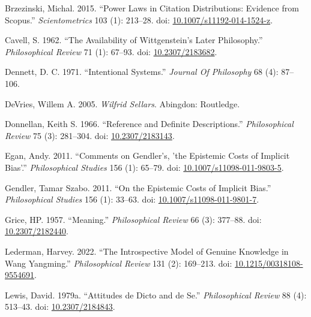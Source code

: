 \documentclass[
  10pt,
  letterpaper,
  DIV=11,
  numbers=noendperiod,
  twoside]{scrartcl}
\newlength{\cslhangindent}
\newenvironment{CSLReferences}[2] %
 {\begin{list}{}{%
  \setlength{\itemindent}{0pt}
  \setlength{\leftmargin}{0pt}
  \setlength{\parsep}{0pt}
  \ifodd #1
   \setlength{\leftmargin}{\cslhangindent}
   \setlength{\itemindent}{-1\cslhangindent}
  \fi
  \setlength{\itemsep}{#2\baselineskip}}}
 {\end{list}}
\begin{document}
\label{refs}
\begin{CSLReferences}{1}{0}
Brzezinski, Michal. 2015. {``Power Laws in Citation Distributions:
Evidence from Scopus.''} \emph{Scientometrics} 103 (1): 213--28. doi:
\href{https://doi.org/10.1007/s11192-014-1524-z}{10.1007/s11192-014-1524-z}.

Cavell, S. 1962. {``The Availability of Wittgenstein's Later
Philosophy.''} \emph{Philosophical Review} 71 (1): 67--93. doi:
\href{https://doi.org/10.2307/2183682}{10.2307/2183682}.

Dennett, D. C. 1971. {``Intentional Systems.''} \emph{Journal Of
Philosophy} 68 (4): 87--106.

DeVries, Willem A. 2005. \emph{Wilfrid Sellars}. Abingdon: Routledge.

Donnellan, Keith S. 1966. {``Reference and Definite Descriptions.''}
\emph{Philosophical Review} 75 (3): 281--304. doi:
\href{https://doi.org/10.2307/2183143}{10.2307/2183143}.

Egan, Andy. 2011. {``Comments on Gendler's, 'the Epistemic Costs of
Implicit Bias'.''} \emph{Philosophical Studies} 156 (1): 65--79. doi:
\href{https://doi.org/10.1007/s11098-011-9803-5}{10.1007/s11098-011-9803-5}.

Gendler, Tamar Szabo. 2011. {``On the Epistemic Costs of Implicit
Bias.''} \emph{Philosophical Studies} 156 (1): 33--63. doi:
\href{https://doi.org/10.1007/s11098-011-9801-7}{10.1007/s11098-011-9801-7}.

Grice, HP. 1957. {``Meaning.''} \emph{Philosophical Review} 66 (3):
377--88. doi: \href{https://doi.org/10.2307/2182440}{10.2307/2182440}.

Lederman, Harvey. 2022. {``The Introspective Model of Genuine Knowledge
in Wang Yangming.''} \emph{Philosophical Review} 131 (2): 169--213. doi:
\href{https://doi.org/10.1215/00318108-9554691}{10.1215/00318108-9554691}.

Lewis, David. 1979a. {``Attitudes de Dicto and de Se.''}
\emph{Philosophical Review} 88 (4): 513--43. doi:
\href{https://doi.org/10.2307/2184843}{10.2307/2184843}.


\end{CSLReferences}
\end{document}
